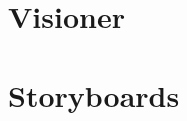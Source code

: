 \begin{appendices}
    \section{Visioner}
    
    

    \section{Storyboards}
    
\end{appendices}


